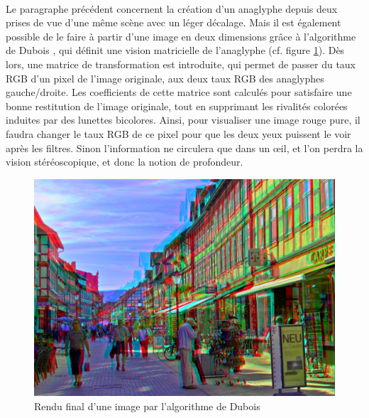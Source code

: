 \paragraph{}
	Le paragraphe précédent concernent la création d’un anaglyphe depuis deux prises de vue d’une même scène avec un léger décalage. Mais il est également possible de le faire à partir d’une image en deux dimensions grâce à l’algorithme de Dubois \cite{algoDubois}, qui définit une vision matricielle de l’anaglyphe (cf. figure \ref{fig:algoDubois}). Dès lors, une matrice de transformation est introduite, qui permet de passer du taux RGB d’un pixel de l’image originale,  aux deux taux RGB des anaglyphes gauche/droite. Les coefficients de cette matrice sont calculés pour satisfaire une bonne restitution de l’image originale, tout en supprimant les rivalités colorées induites par des lunettes bicolores. Ainsi, pour visualiser une image rouge pure, il faudra changer le taux RGB de ce pixel pour que les deux yeux puissent le voir après les filtres. Sinon l’information ne circulera que dans un œil, et l’on perdra la vision stéréoscopique, et donc la notion de profondeur. 
	
\begin{figure}[H]
		\centering
		\includegraphics[scale=0.9]{algoDubois.png}
		\caption{\label{fig:algoDubois} Rendu final d’une image par l’algorithme de Dubois \protect \footnotemark }
\end{figure}
	
	
